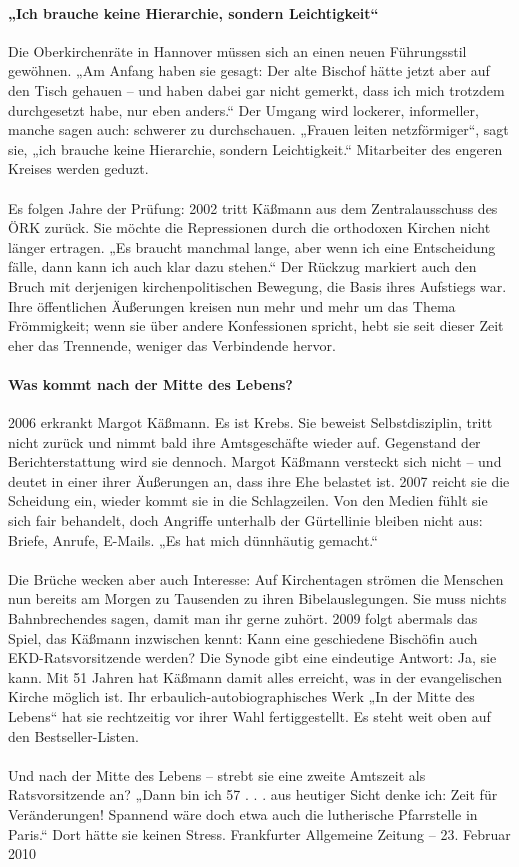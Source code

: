 \documentclass[a4paper,12pt,twoside]{scrbook}
\begin{document}
\paragraph{„Ich brauche keine Hierarchie, sondern Leichtigkeit“}
Die Oberkirchenräte in Hannover müssen sich an einen neuen Führungsstil gewöhnen. „Am Anfang haben sie gesagt: Der alte Bischof hätte jetzt aber auf den Tisch gehauen – und haben dabei gar nicht gemerkt, dass ich mich trotzdem durchgesetzt habe, nur eben anders.“ Der Umgang wird lockerer, informeller, manche sagen auch: schwerer zu durchschauen. „Frauen leiten netzförmiger“, sagt sie, „ich brauche keine Hierarchie, sondern Leichtigkeit.“ Mitarbeiter des engeren Kreises werden geduzt.
\\\\
Es folgen Jahre der Prüfung: 2002 tritt Käßmann aus dem Zentralausschuss des ÖRK zurück. Sie möchte die Repressionen durch die orthodoxen Kirchen nicht länger ertragen. „Es braucht manchmal lange, aber wenn ich eine Entscheidung fälle, dann kann ich auch klar dazu stehen.“ Der Rückzug markiert auch den Bruch mit derjenigen kirchenpolitischen Bewegung, die Basis ihres Aufstiegs war. Ihre öffentlichen Äußerungen kreisen nun mehr und mehr um das Thema Frömmigkeit; wenn sie über andere Konfessionen spricht, hebt sie seit dieser Zeit eher das Trennende, weniger das Verbindende hervor.
\paragraph{Was kommt nach der Mitte des Lebens?}
2006 erkrankt Margot Käßmann. Es ist Krebs. Sie beweist Selbstdisziplin, tritt nicht zurück und nimmt bald ihre Amtsgeschäfte wieder auf. Gegenstand der Berichterstattung wird sie dennoch. Margot Käßmann versteckt sich nicht – und deutet in einer ihrer Äußerungen an, dass ihre Ehe belastet ist. 2007 reicht sie die Scheidung ein, wieder kommt sie in die Schlagzeilen. Von den Medien fühlt sie sich fair behandelt, doch Angriffe unterhalb der Gürtellinie bleiben nicht aus: Briefe, Anrufe, E-Mails. „Es hat mich dünnhäutig gemacht.“
\\\\
Die Brüche wecken aber auch Interesse: Auf Kirchentagen strömen die Menschen nun bereits am Morgen zu Tausenden zu ihren Bibelauslegungen. Sie muss nichts Bahnbrechendes sagen, damit man ihr gerne zuhört. 2009 folgt abermals das Spiel, das Käßmann inzwischen kennt: Kann eine geschiedene Bischöfin auch EKD-Ratsvorsitzende werden? Die Synode gibt eine eindeutige Antwort: Ja, sie kann. Mit 51 Jahren hat Käßmann damit alles erreicht, was in der evangelischen Kirche möglich ist. Ihr erbaulich-autobiographisches Werk „In der Mitte des Lebens“ hat sie rechtzeitig vor ihrer Wahl fertiggestellt. Es steht weit oben auf den Bestseller-Listen.
\\\\
Und nach der Mitte des Lebens – strebt sie eine zweite Amtszeit als Ratsvorsitzende an? „Dann bin ich 57 . . . aus heutiger Sicht denke ich: Zeit für Veränderungen! Spannend wäre doch etwa auch die lutherische Pfarrstelle in Paris.“ Dort hätte sie keinen Stress.
\newpage
Frankfurter Allgemeine Zeitung \hfill -- \hfill 23. Februar 2010
\end{document}

